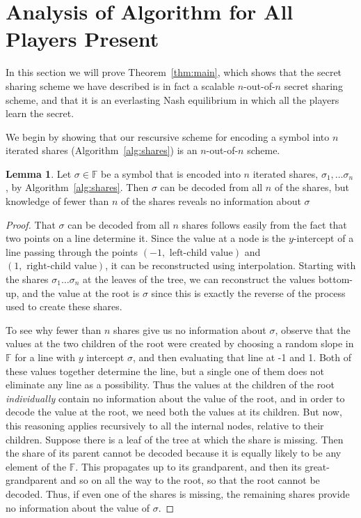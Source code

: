 \documentclass[12pt]{article}
\theoremstyle{definition}
\newtheorem{lemma}[theorem]{Lemma}
\newcommand{\F}{\mathbb{F}}
\begin{document}
\section{Analysis of Algorithm for All Players Present}\label{sec:analysis}

In this section we will prove Theorem~\ref{thm:main}, which shows that the secret 
sharing scheme we have described is in fact a scalable $n$-out-of-$n$ 
secret sharing scheme, and that it is an everlasting Nash equilibrium 
in which all the players learn the secret. 

We begin by showing that our rescursive scheme for encoding a symbol into $n$ 
iterated shares (Algorithm~\ref{alg:shares}) is an $n$-out-of-$n$ scheme.

\begin{lemma}\label{lem:shares}
Let $\sigma \in \F$ be a symbol that is encoded into $n$ iterated 
shares, $\sigma_1, \dots \sigma_n$, by Algorithm~\ref{alg:shares}. Then $\sigma$
can be decoded from all $n$ of the shares, but knowledge of fewer than 
$n$ of the shares reveals no information about $\sigma$
\end{lemma}
\begin{proof}
That $\sigma$ can be decoded from all $n$ shares follows easily from the fact 
that two points on a line determine it. Since the value at a node is the 
$y$-intercept of a line passing through the points 
$(-1, \mbox{ left-child value})$ and $(1, \mbox{ right-child value})$, it 
can be reconstructed using interpolation. Starting with the shares 
$\sigma_1 \dots \sigma_n$ at the leaves of the tree, we can reconstruct the 
values bottom-up, and the value at the root is $\sigma$ since this is 
exactly the reverse of the process used to create these shares.

To see why fewer than $n$ shares give us no information about $\sigma$, 
observe that the values at the two children of the root were created by 
choosing a random slope in $\F$ for a line with $y$ intercept $\sigma$, 
and then 
evaluating that line at -1 and 1. Both of these values together determine 
the line, but a single one of them does not eliminate any line as a 
possibility. Thus the values at the children of the root \emph{individually} 
contain no information about the value of the root, and in order to decode 
the value at the root, we need both the values at its children. But now, this 
reasoning applies recursively to all the internal nodes, relative to their 
children. Suppose there is a leaf of the tree at which the share is 
missing. Then the share of its parent cannot be decoded because it is 
equally likely to be any element of the $\F$. This propagates up to its 
grandparent, and then its great-grandparent and so on all the way to the root, 
so that the root cannot be decoded.  
Thus, if even one of the shares is missing, the remaining shares provide 
no information about the value of $\sigma$.
\end{proof}
\end{document}
